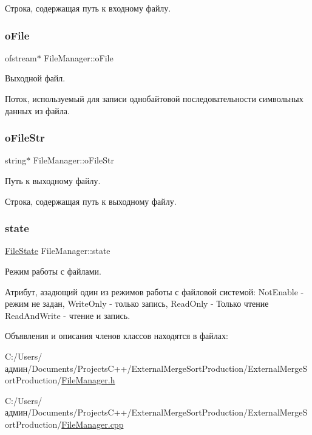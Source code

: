 Строка, содержащая путь к входному файлу. \hypertarget{class_file_manager_afe31c07e311212814e4a8ba01c7436a1}{}\label{class_file_manager_afe31c07e311212814e4a8ba01c7436a1} 
\subsubsection{\texorpdfstring{o\+File}{oFile}}
{\footnotesize\ttfamily ofstream$\ast$ File\+Manager\+::o\+File\hspace{0.3cm}{\ttfamily [private]}}



Выходной файл. 

Поток, используемый для записи однобайтовой последовательности символьных данных из файла. \hypertarget{class_file_manager_adf10708d6e8e3b4d329077af4666e147}{}\label{class_file_manager_adf10708d6e8e3b4d329077af4666e147} 
\subsubsection{\texorpdfstring{o\+File\+Str}{oFileStr}}
{\footnotesize\ttfamily string$\ast$ File\+Manager\+::o\+File\+Str\hspace{0.3cm}{\ttfamily [private]}}



Путь к выходному файлу. 

Строка, содержащая путь к выходному файлу. \hypertarget{class_file_manager_a84bbcd4e3807e076ecdbd0e5dfbefa5f}{}\label{class_file_manager_a84bbcd4e3807e076ecdbd0e5dfbefa5f} 
\subsubsection{\texorpdfstring{state}{state}}
{\footnotesize\ttfamily \hyperlink{_structures_8h_a57306ae0f9e356347388234ed69e0ce7}{File\+State} File\+Manager\+::state\hspace{0.3cm}{\ttfamily [private]}}



Режим работы с файлами. 

Атрибут, азадющий один из режимов работы с файловой системой\+: Not\+Enable -\/ режим не задан, Write\+Only -\/ только запись, Read\+Only -\/ Только чтение Read\+And\+Write -\/ чтение и запись. 

Объявления и описания членов классов находятся в файлах\+:\begin{DoxyCompactItemize}
\item 
C\+:/\+Users/админ/\+Documents/\+Projects\+C++/\+External\+Merge\+Sort\+Production/\+External\+Merge\+Sort\+Production/\hyperlink{_file_manager_8h}{File\+Manager.\+h}\item 
C\+:/\+Users/админ/\+Documents/\+Projects\+C++/\+External\+Merge\+Sort\+Production/\+External\+Merge\+Sort\+Production/\hyperlink{_file_manager_8cpp}{File\+Manager.\+cpp}\end{DoxyCompactItemize}
